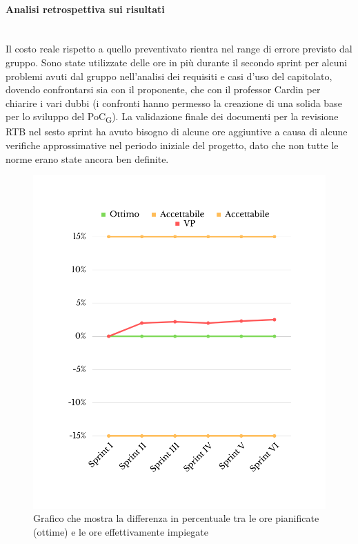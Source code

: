\paragraph{Analisi retrospettiva sui risultati}\mbox{}\\
Il costo reale rispetto a quello preventivato rientra nel range di errore previsto dal gruppo. Sono state utilizzate delle ore in più durante il secondo sprint per alcuni problemi avuti dal gruppo nell'analisi dei requisiti e casi d'uso del capitolato, dovendo confrontarsi sia con il proponente, che con il professor Cardin per chiarire i vari dubbi (i confronti hanno permesso la creazione di una solida base per lo sviluppo del PoC\textsubscript{G}). La validazione finale dei documenti per la revisione RTB nel sesto sprint ha avuto bisogno di alcune ore aggiuntive a causa di alcune verifiche approssimative nel periodo iniziale del progetto, dato che non tutte le norme erano state ancora ben definite.
\begin{figure}[H]
	\centering
	\includegraphics[scale=0.5]{img/SV.png}
	\caption{Grafico che mostra la differenza in percentuale tra le ore pianificate (ottime) e le ore effettivamente impiegate}
\end{figure}
